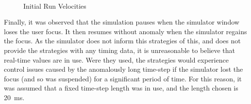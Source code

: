 \documentclass[10pt]{article}
\begin{document}
\begin{figure}
 \centering
 \\
 \caption{Initial Run Velocities}
 \label{fig:initialSpeedTestRun}
\end{figure}

Finally, it was observed that the simulation pauses when the simulator window
loses the user focus.  It then resumes without anomaly when the simulator
regains the focus.  As the simulator does not inform this strategies of this,
and does not provide the strategies with any timing data, it is unreasonable to
believe that real-time values are in use.  Were they used, the strategies would
experience control issues caused by the anomalously long time-step if the
simulator lost the focus (and so was suspended) for a significant period of
time.  For this reason, it was assumed that a fixed time-step length was in use,
and the length chosen is \SI{20}{\milli\second}.
\end{document}
